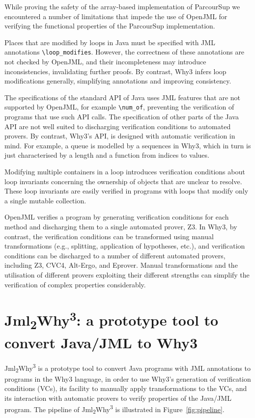 \documentclass[a4paper]{report}
\newcommand{\jmlwhy}{\texorpdfstring{Jml\textsubscript{2}Why\textsuperscript{3}}{Jml2Why3}}
\begin{document}
While proving the safety of the array-based implementation of ParcourSup we
encountered a number of limitations that impede the use of OpenJML for verifying
the functional properties of the ParcourSup implementation.

Places that are modified by loops in Java must be specified with JML annotations
\lstinline{\loop_modifies}. However, the correctness of these annotations are
not checked by OpenJML, and their incompleteness may introduce inconsistencies,
invalidating further proofs. By contrast, Why3 infers loop modifications
generally, simplifying annotations and improving consistency.

The specifications of the standard API of Java uses JML features that are not
supported by OpenJML, for example \lstinline{\num_of}, preventing the
verification of programs that use such API calls. The specification of other
parts of the Java API are not well suited to discharging verification conditions
to automated provers. By contrast, Why3's API, is designed with automatic
verification in mind. For example, a queue is modelled by a sequences in Why3,
which in turn is just characterised by a length and a function from indices to
values.

Modifying multiple containers in a loop introduces verification conditions about
loop invariants concerning the ownership of objects that are unclear to resolve.
These loop invariants are easily verified in programs with loops that modify
only a single mutable collection.

OpenJML verifies a program by generating verification conditions for each method
and discharging them to a single automated prover, Z3. In Why3, by contrast, the
verification conditions can be transformed using manual transformations (e.g.,
splitting, application of hypotheses, etc.), and verification conditions can be
discharged to a number of different automated provers, including Z3, CVC4,
Alt-Ergo, and Eprover. Manual transformations and the utilisation of different
provers exploiting their different strengths can simplify the verification of
complex properties considerably.

\section{\jmlwhy: a prototype tool to convert Java/JML to Why3}
\label{sec:jml2why3}

\jmlwhy{} is a prototype tool to convert Java programs with JML annotations to
programs in the Why3 language, in order to use Why3's generation of verification
conditions (VCs), its facility to manually apply transformations to the VCs, and
its interaction with automatic provers to verify properties of the Java/JML
program. The pipeline of \jmlwhy{} is illustrated in Figure~\ref{fig:pipeline}.
\end{document}
